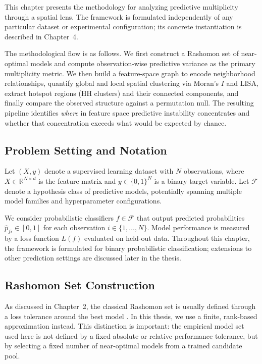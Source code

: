 This chapter presents the methodology for analyzing predictive multiplicity through a
spatial lens. The framework is formulated independently of any particular dataset or
experimental configuration; its concrete instantiation is described in Chapter~4.

The methodological flow is as follows. We first construct a Rashomon set of near-optimal
models and compute observation-wise predictive variance as the primary multiplicity metric. We then build a feature-space graph to encode neighborhood relationships, quantify
global and local spatial clustering via Moran's $I$ and LISA, extract hotspot regions (HH
clusters) and their connected components, and finally compare the observed structure
against a permutation null. The resulting pipeline identifies \emph{where} in feature space
predictive instability concentrates and whether that concentration exceeds what would be
expected by chance.

\subsection{Problem Setting and Notation}

Let $(X, y)$ denote a supervised learning dataset with $N$ observations, where
$X \in \mathbb{R}^{N \times d}$ is the feature matrix and
$y \in \{0,1\}^N$ is a binary target variable. Let $\mathcal{F}$ denote a hypothesis class
of predictive models, potentially spanning multiple model families and hyperparameter
configurations.

We consider probabilistic classifiers $f \in \mathcal{F}$ that output predicted probabilities
$\hat{p}_{fi} \in [0,1]$ for each observation $i \in \{1,\dots,N\}$. Model performance is
measured by a loss function $L(f)$ evaluated on held-out data. Throughout this chapter,
the framework is formulated for binary probabilistic classification; extensions to other
prediction settings are discussed later in the thesis.

\subsection{Rashomon Set Construction}
\label{sec:meth-rashomon}

As discussed in Chapter~2, the classical Rashomon set is usually defined through a loss
tolerance around the best model \citep{breiman_statistical_2001, marx_predictive_2020,
semenova_existence_2022}. In this thesis, we use a finite, rank-based approximation
instead. This distinction is important: the empirical model set used here is not defined by
a fixed absolute or relative performance tolerance, but by selecting a fixed number of
near-optimal models from a trained candidate pool.


